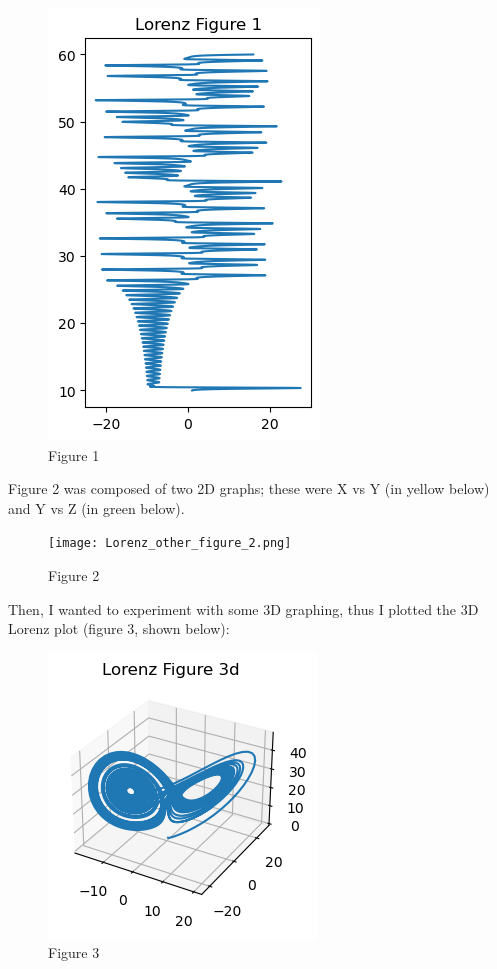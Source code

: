 \documentclass{article}
\begin{document}
\begin{figure}

\includegraphics[width=.6\linewidth,height=280\texthheight]{Lorenz_figure_1_rotated.png} 
\caption{Figure 1}
\label{fig:wrapfig}
\end{figure}

Figure 2 was composed of two 2D graphs; these were X vs Y (in yellow below) and Y vs Z (in green below).

\begin{figure}

\texttt{[image: Lorenz\_other\_figure\_2.png]} 
\caption{Figure 2}
\label{fig:wrapfig}
\end{figure}

Then, I wanted to experiment with some 3D graphing, thus I plotted the 3D Lorenz plot (figure 3, shown below):

\begin{figure}

\includegraphics[width=.6\linewidth,height=280\texthheight]{Lorenz_3d.png} 
\caption{Figure 3}
\label{fig:wrapfig}
\end{figure}
\end{document}
